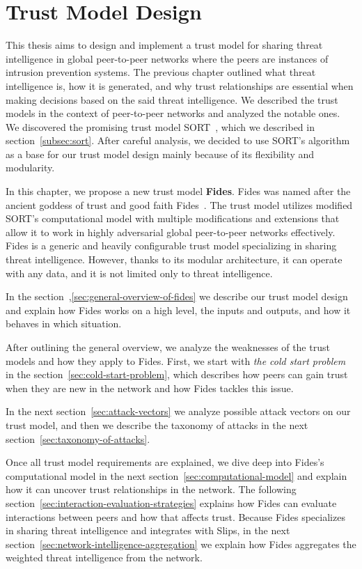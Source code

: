 \chapter{Trust Model Design}
\label{ch:trust-model-design}
This thesis aims to design and implement a trust model for sharing threat intelligence in global peer-to-peer networks where the peers are instances of intrusion prevention systems.
The previous chapter outlined what threat intelligence is, how it is generated, and why trust relationships are essential when making decisions based on the said threat intelligence.
We described the trust models in the context of peer-to-peer networks and analyzed the notable ones.
We discovered the promising trust model SORT~,\cite{sort} which we described in section~\ref{subsec:sort}. After careful analysis, we decided to use SORT's algorithm as a base for our trust model design mainly because of its flexibility and modularity.

In this chapter, we propose a new trust model \textbf{Fides}.
Fides was named after the ancient goddess of trust and good faith Fides~\cite{enwiki:1086924565}.
The trust model utilizes modified SORT's computational model with multiple modifications and extensions that allow it to work in highly adversarial global peer-to-peer networks effectively.
Fides is a generic and heavily configurable trust model specializing in sharing threat intelligence.
However, thanks to its modular architecture, it can operate with any data, and it is not limited only to threat intelligence.

In the section~,\ref{sec:general-overview-of-fides} we describe our trust model design and explain how Fides works on a high level, the inputs and outputs, and how it behaves in which situation.

After outlining the general overview, we analyze the weaknesses of the trust models and how they apply to Fides.
First, we start with \textit{the cold start problem} in the section~\ref{sec:cold-start-problem}, which describes how peers can gain trust when they are new in the network and how Fides tackles this issue.

In the next section~\ref{sec:attack-vectors} we analyze possible attack vectors on our trust model, and then we describe the taxonomy of attacks in the next section~\ref{sec:taxonomy-of-attacks}.

Once all trust model requirements are explained, we dive deep into Fides's computational model in the next section~\ref{sec:computational-model}  and explain how it can uncover trust relationships in the network.
The following section~\ref{sec:interaction-evaluation-strategies} explains how Fides can evaluate interactions between peers and how that affects trust.
Because Fides specializes in sharing threat intelligence and integrates with Slips, in the next section~\ref{sec:network-intelligence-aggregation} we explain how Fides aggregates the weighted threat intelligence from the network.

